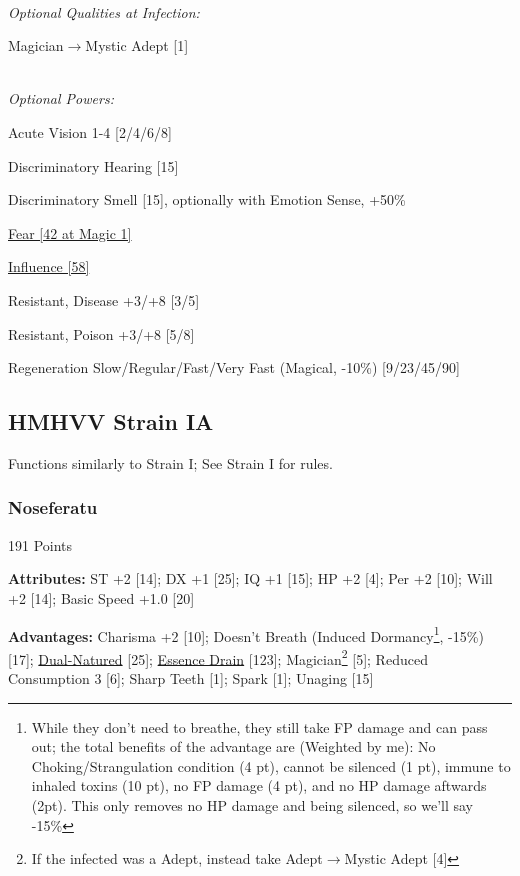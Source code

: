 \begin{multicols*}{3}
	\textit{\\Optional Qualities at Infection:}
	
	Magician$\rightarrow$Mystic Adept [1]
		
	\textit{\\Optional Powers:}
	
	Acute Vision 1-4 [2/4/6/8]
	
	Discriminatory Hearing [15]
	
	Discriminatory Smell [15], optionally with Emotion Sense, +50\%
	
	\hyperref[fear]{Fear [42 at Magic 1]}
	
	\hyperref[influence]{Influence [58]}
		
	Resistant, Disease +3/+8 [3/5]
		
	Resistant, Poison +3/+8 [5/8]
	
	Regeneration Slow/Regular/Fast/Very Fast (Magical, -10\%) [9/23/45/90]
	
	\subsection*{HMHVV Strain IA}
	
	Functions similarly to Strain I; See Strain I for rules.
	
	\subsubsection{Noseferatu}\label{nosferatu}
	\begin{flushright}
		191 Points
	\end{flushright}
	
	\textbf{Attributes:}
	ST +2 [14]; DX +1 [25]; IQ +1 [15]; HP +2 [4]; Per +2 [10]; Will +2 [14]; Basic Speed +1.0 [20]
	
	\textbf{Advantages:}
	Charisma +2 [10]; Doesn't Breath (Induced Dormancy\footnote{While they don't need to breathe, they still take FP damage and can pass out; the total benefits of the advantage are (Weighted by me): No Choking/Strangulation condition (4 pt), cannot be silenced (1 pt), immune to inhaled toxins (10 pt), no FP damage (4 pt), and no HP damage aftwards (2pt). This only removes no HP damage and being silenced, so we'll say -15\%}, -15\%) [17]; \hyperref[dual_natured]{Dual-Natured} [25];  \hyperref[essence_drain]{Essence Drain} [123]; Magician\footnote{If the infected was a Adept, instead take Adept$\rightarrow$Mystic Adept [4]} [5]; Reduced Consumption 3 [6]; Sharp Teeth [1]; Spark [1]; Unaging [15]
	

\end{multicols*}
